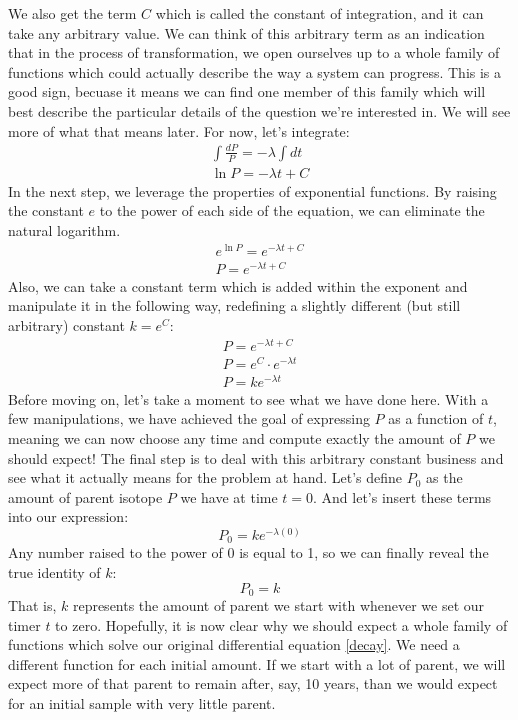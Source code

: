\documentclass[addpoints, 12pt]{exam}
\begin{document}
We also get the term $C$ which is called the constant of integration, and it can take any arbitrary value. We can think of this arbitrary term as an indication that in the process of transformation, we open ourselves up to a whole family of functions which could actually describe the way a system can progress. This is a good sign, becuase it means we can find one member of this family which will best describe the particular details of the question we're interested in. We will see more of what that means later. For now, let's integrate:
\begin{gather*}
	\int\frac{dP}{P}=-\lambda\int dt\\
	\ln P=-\lambda t+C
\end{gather*}
In the next step, we leverage the properties of exponential functions. By raising the constant $e$ to the power of each side of the equation, we can eliminate the natural logarithm.
\begin{gather*}
	e^{\ln P}=e^{-\lambda t+C}\\
	P=e^{-\lambda t+C}
\end{gather*}
Also, we can take a constant term which is added within the exponent and manipulate it in the following way, redefining a slightly different (but still arbitrary) constant $k=e^C$:
\begin{gather*}
	P=e^{-\lambda t+C}\\
	P=e^C\cdot e^{-\lambda t}\\
	P=ke^{-\lambda t}
\end{gather*}
Before moving on, let's take a moment to see what we have done here. With a few manipulations, we have achieved the goal of expressing $P$ as a function of $t$, meaning we can now choose any time and compute exactly the amount of $P$ we should expect! The final step is to deal with this arbitrary constant business and see what it actually means for the problem at hand. Let's define $P_0$ as the amount of parent isotope $P$ we have at time $t=0$. And let's insert these terms into our expression:
\[P_0=ke^{-\lambda (0)}\]
Any number raised to the power of 0 is equal to 1, so we can finally reveal the true identity of $k$:
\[P_0=k\]
That is, $k$ represents the amount of parent we start with whenever we set our timer $t$ to zero. Hopefully, it is now clear why we should expect a whole family of functions which solve our original differential equation \ref{decay}. We need a different function for each initial amount. If we start with a lot of parent, we will expect more of that parent to remain after, say, 10 years, than we would expect for an initial sample with very little parent.
\end{document}
